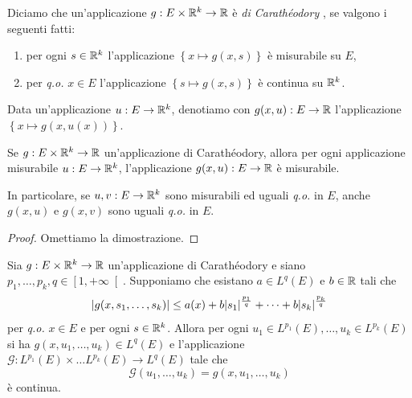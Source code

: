 \begin{definizione}
	Diciamo che un'applicazione $g : E \times \mathbb{R}^k \to \mathbb{R}$ è \emph{di Carathéodory} , se valgono i seguenti fatti:
	\begin{enumerate}[$(a)$]
		\item per ogni $s \in \mathbb{R}^k$ l'applicazione $\left\lbrace x \mapsto g(x,s) \right\rbrace$ è misurabile su $E$,
		\item per \emph{q.o.} $x \in E$ l'applicazione $\left\lbrace s \mapsto g(x,s) \right\rbrace$ è continua su $\mathbb{R}^k$.
	\end{enumerate}
\end{definizione}
\begin{notazione}
	Data un'applicazione $u: E \to \mathbb{R}^k$, denotiamo con $g(x, u): E \to \mathbb{R}$ l'applicazione $\left\lbrace x \longmapsto g(x,u(x))\right\rbrace$.
\end{notazione}
\begin{teorema}\label{tecnicoperNemytskij}
	Se $g : E \times \mathbb{R}^k \to \mathbb{R}$ un'applicazione di Carathéodory, allora per ogni applicazione misurabile $u : E \to \mathbb{R}^k$, l'applicazione $g(x,u): E \to \mathbb{R}$ è
	misurabile.
	
	In particolare, se $u,v: E \to \mathbb{R}^k$ sono misurabili ed uguali \emph{q.o.} in $E$, anche $g(x, u)$ e $g(x, v)$ sono uguali \emph{q.o.} in $E$.
\end{teorema}
\begin{proof}
	Omettiamo la dimostrazione.
\end{proof}
\begin{teorema}\label{fondamentalepercontinuitàNemytskij}
	Sia $g: E \times \mathbb{R}^k \to \mathbb{R}$ un'applicazione di Carathéodory e siano $p_1,\dots, p_k,q \in \left[ 1,+\infty\right[$. Supponiamo che esistano $a \in L^q(E)$ e $b \in \mathbb{R}$ tali che
	\[ \lvert g(x,s_1,\dots,s_k)\rvert \le a(x) + b\lvert s_1\rvert^{\frac{p_1}{q}} + \dots + b\lvert s_k\rvert^{\frac{p_k}{q}} \]
	per \emph{q.o.} $x \in E$ e per ogni $s \in \mathbb{R}^k$.
	Allora per ogni $u_1 \in L^{p_1}(E), \dots, u_k \in L^{p_k}(E)$ si ha $g(x,u_1,\dots , u_k) \in L^q(E)$ e l’applicazione $\mathcal{G}: L^{p_1}(E) \times \dots L^{p_k}(E) \to L^q(E)$ tale che
	\[ \mathcal{G}(u_1,\dots,u_k) = g(x,u_1,\dots,u_k) \]
	è continua.
\end{teorema}
